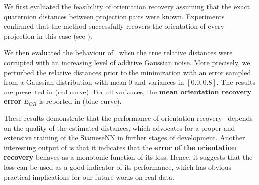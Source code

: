 We first evaluated the feasibility of orientation recovery assuming that the exact quaternion distances between projection pairs were known.
Experiments confirmed that the method successfully recovers the orientation of every projection in this case (see ).

We then evaluated the behaviour of~ when the true relative distances were corrupted with an increasing level of additive Gaussian noise. More precisely, we perturbed the relative distances prior to the minimization with an error sampled from a Gaussian distribution with mean 0 and variances in $[0.0, 0.8]$.
The results are presented in  (red curve).
For all variances, the \textbf{mean orientation recovery error} $E_{OR}$ is reported in  (blue curve).


These results demonstrate that the performance of orientation recovery~ depends on the quality of the estimated distances, which advocates for a proper and extensive training of the SiameseNN in further stages of development.
Another interesting output of  is that it indicates that the \textbf{error of the orientation recovery} behaves as a monotonic function of its loss.
Hence, it suggests that the loss can be used as a good indicator of its performance, which has obvious practical implications for our future works on real data.

